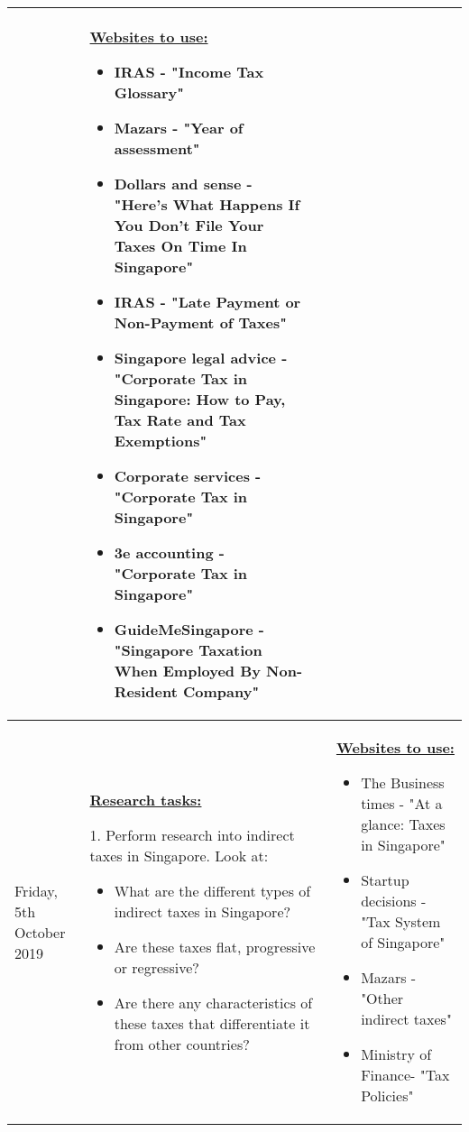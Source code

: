 \documentclass[12pt, a4paper]{article}
\newlength\combinedlength
\begin{document}
\begin{landscape}
\begin{longtable}{|m{5cm}|m{5cm}|m{5cm}|m{10.31cm}|}
{		}&
		
		
		\textbf{\underline{Websites to use:}}
		\newline
		
		\begin{itemize}
			\item IRAS - "Income Tax Glossary"
			\item Mazars - "Year of assessment"
			\item Dollars and sense - "Here’s What Happens If You Don’t File Your Taxes On Time In Singapore"
			\item IRAS - "Late Payment or Non-Payment of Taxes"
			\item Singapore legal advice - "Corporate Tax in Singapore: How to Pay, Tax Rate and Tax Exemptions"
			\item Corporate services - "Corporate Tax in Singapore"
			\item 3e accounting - "Corporate Tax in Singapore"
			\item GuideMeSingapore - "Singapore Taxation When Employed By Non-Resident Company"
		\end{itemize}
		
		\\
		\hline
		
		Friday, 5th October 2019 & \multicolumn{2}{|m{\combinedlength}|}{	
			
			\textbf{\underline{Research tasks:}}
			\newline
			
			1. Perform research into indirect taxes in Singapore. Look at:
			
			\begin{itemize}
				\item What are the different types of indirect taxes in Singapore?
				\item Are these taxes flat, progressive or regressive?
				\item Are there any characteristics of these taxes that differentiate it from other countries?
			\end{itemize}
			
		}&
		
		
		\textbf{\underline{Websites to use:}}
		\newline
		
		\begin{itemize}
			\item The Business times - "At a glance: Taxes in Singapore"
			\item Startup decisions - "Tax System of Singapore"
			\item Mazars - "Other indirect taxes"
			\item Ministry of Finance- "Tax Policies"
		\end{itemize}
		

\end{longtable}
\end{landscape}
\end{document}
